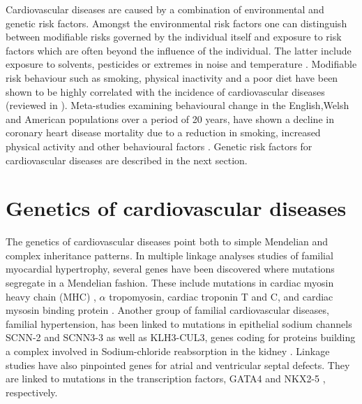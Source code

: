 Cardiovascular diseases are caused by a combination of environmental and genetic risk factors. Amongst the environmental risk factors one can distinguish between modifiable risks governed by the individual itself and exposure to risk factors which are often beyond the influence of the individual. The latter include exposure to solvents, pesticides or extremes in noise and temperature \citep{Bhatnagar2004,Brook2010,Babisch2014}. Modifiable risk behaviour such as smoking, physical inactivity and a poor diet have been shown to be highly correlated with the incidence of cardiovascular diseases (reviewed in \citep{OToole2008,Cosselman2015}). Meta-studies examining behavioural change in the English,Welsh and American populations over a period of 20 years, have shown a decline in coronary heart disease mortality due to a reduction in smoking, increased physical activity and other behavioural factors \citep{Unal2004,Ford2007}. Genetic risk factors for cardiovascular diseases are described in the next section. 


\section{Genetics of cardiovascular diseases}
The genetics of cardiovascular diseases point both to simple Mendelian and complex inheritance patterns. In multiple linkage analyses studies of familial myocardial hypertrophy, several genes have been discovered where mutations segregate in a Mendelian fashion. These include mutations in cardiac myosin heavy chain (MHC) \citep{Geisterfer-Lowrance1990}, \(\alpha\) tropomyosin, cardiac troponin T and C, \citep{Thierfelder1994, Kimura1997} and cardiac mysosin binding protein \citep{Carrier1993,Bonne1995}. Another group of familial cardiovascular diseases, familial hypertension, has been linked to mutations in epithelial sodium channels  SCNN-2 and SCNN3-3 \citep{Boyden2012,Glover2014} as well as KLH3-CUL3, genes coding for proteins building a complex involved in Sodium-chloride reabsorption in the kidney  \citep{Hansson1995}. Linkage studies have also pinpointed genes for atrial and ventricular septal defects. They are linked to mutations in the transcription factors,  GATA4 \citep{Schott1998} and NKX2-5 \citep{Garg2003}, respectively. 

